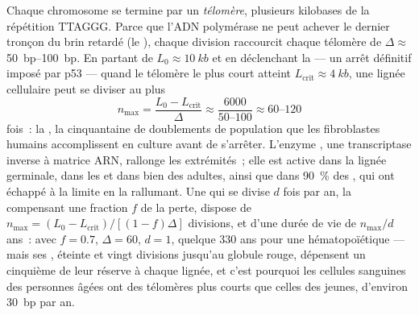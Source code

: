 \begin{theorem}\label{thm:b3:stem-cells:hayflick}
Chaque chromosome se termine par un \emph{télomère}, plusieurs
kilobases de la répétition TTAGGG. Parce que l'ADN polymérase ne peut
achever le dernier tronçon du brin retardé (le \emph{}), chaque division raccourcit chaque télomère
de $\Delta \approx$ \qtyrange{50}{100}{bp}. En partant de
$L_{0} \approx \qty{10}{kb}$ et en déclenchant la \emph{} --- un arrêt définitif imposé par p53 --- quand le télomère
le plus court atteint $L_{\text{crit}} \approx \qty{4}{kb}$, une lignée
cellulaire peut se diviser au plus
\[
n_{\max} = \frac{L_{0} - L_{\text{crit}}}{\Delta} \approx \frac{6000}{50\text{--}100} \approx 60\text{--}120
\]
fois~: la \emph{}, la cinquantaine de doublements de
population que les fibroblastes humains accomplissent en culture avant
de s'arrêter. L'enzyme \emph{}, une transcriptase inverse à
matrice ARN, rallonge les extrémités~; elle est active dans la lignée
germinale, dans les  et dans bien des
 adultes, ainsi que dans \qty{90}{\%} des , qui
ont échappé à la limite en la rallumant. Une  qui se
divise $d$ fois par an, la  compensant une fraction $f$ de la
perte, dispose de $n_{\max} = (L_{0} - L_{\text{crit}})/[(1 - f)\Delta]$
divisions, et d'une durée de vie de $n_{\max}/d$ ans~: avec $f = 0.7$,
$\Delta
= 60$, $d = 1$, quelque 330 ans pour une 
hématopoïétique --- mais ses ,  éteinte et vingt
divisions jusqu'au globule rouge, dépensent un cinquième de leur réserve
à chaque lignée, et c'est pourquoi les cellules sanguines des personnes
âgées ont des télomères plus courts que celles des jeunes, d'environ
\qty{30}{bp} par an.
\end{theorem}
